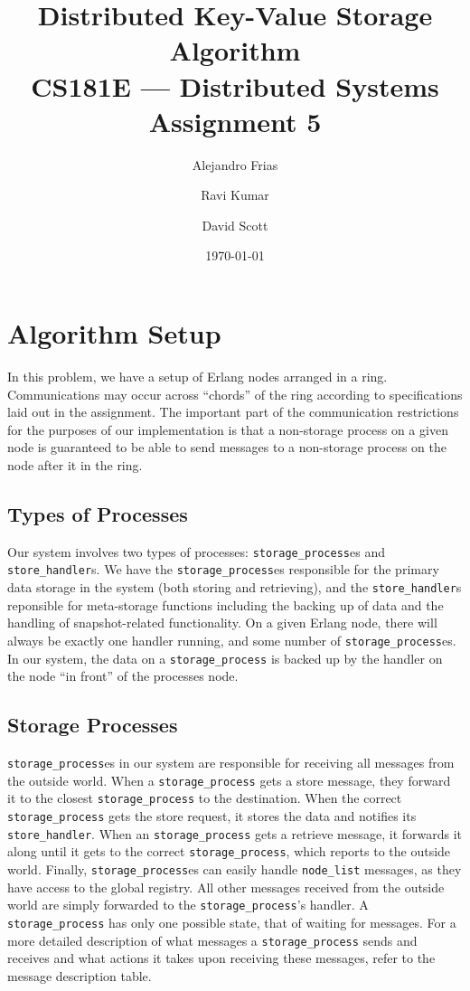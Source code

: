 \documentclass[12pt,letterpaper]{article}
\author{Alejandro Frias \and Ravi Kumar \and David Scott}
\date{\today}
\title{Distributed Key-Value Storage Algorithm\\CS181E --- Distributed Systems\\Assignment 5}
\renewcommand{\tt}[1]{\texttt{#1}}
\newcommand{\sh}{\tt{store\_handler}}
\renewcommand{\sp}{\tt{storage\_process}}
\begin{document}
\maketitle



\section*{Algorithm Setup}

In this problem, we have a setup of Erlang nodes arranged in a ring.  Communications may occur across ``chords'' of the ring according to specifications laid out in the assignment.  The important part of the communication restrictions for the purposes of our implementation is that a non-storage process on a given node is guaranteed to be able to send messages to a non-storage process on the node after it in the ring.

\subsection*{Types of Processes}

Our system involves two types of processes: \sp es and \sh s. We have the \sp es responsible for the primary data storage in the system (both storing and retrieving), and the \sh s reponsible for meta-storage functions including the backing up of data and the handling of snapshot-related functionality. On a given Erlang node, there will always be exactly one handler running, and some number of \sp es. In our system, the data on a \sp{} is backed up by the handler on the node ``in front'' of the processes node.

\subsection*{Storage Processes}

\sp es in our system are responsible for receiving all messages from the outside world. When a \sp{} gets a store message, they forward it to the closest \sp{} to the destination. When the correct \sp{} gets the store request, it stores the data and notifies its \sh. When an \sp{} gets a retrieve message, it forwards it along until it gets to the correct \sp, which reports to the outside world. Finally, \sp es can easily handle \tt{node\_list} messages, as they have access to the global registry. All other messages received from the outside world are simply forwarded to the \sp 's handler. A \sp{} has only one possible state, that of waiting for messages. For a more detailed description of what messages a \sp{} sends and receives and what actions it takes upon receiving these messages, refer to the message description table.
\end{document}
